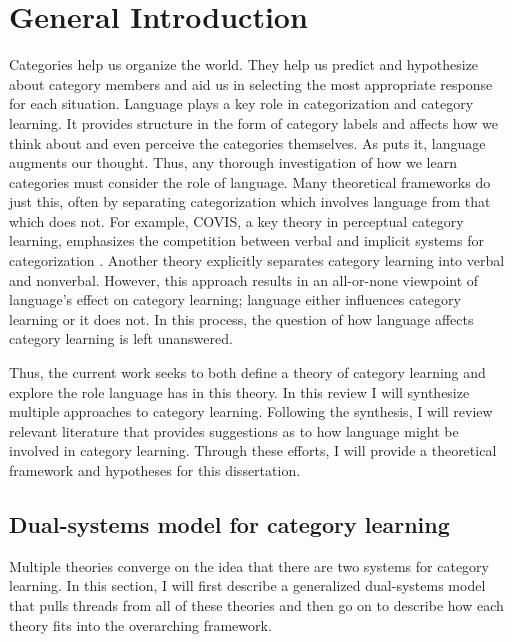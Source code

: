 \documentclass[../dissertation.tex]{subfiles}
\begin{document}
\section{General Introduction}\label{intro}

	Categories help us organize the world. They help us predict and hypothesize about category members and aid us in selecting the most appropriate response for each situation. Language plays a key role in categorization and category learning. It provides structure in the form of category labels and affects how we think about and even perceive the categories themselves. As \citet{Lupyan2012} puts it, language augments our thought. Thus, any thorough investigation of how we learn categories must consider the role of language. Many theoretical frameworks do just this, often by separating categorization which involves language from that which does not. For example, COVIS, a key theory in perceptual category learning, emphasizes the competition between verbal and implicit systems for categorization \citep{Ashby1998}. Another theory explicitly separates category learning into verbal and nonverbal\citep{Minda2010}. However, this approach results in an all-or-none viewpoint of language's effect on category learning; language either influences category learning or it does not. In this process, the question of how language affects category learning is left unanswered. \par
	Thus, the current work seeks to both define a theory of category learning and explore the role language has in this theory. In this review I will synthesize multiple approaches to category learning. Following the synthesis, I will review relevant literature that provides suggestions as to how language might be involved in category learning. Through these efforts, I will provide a theoretical framework and hypotheses for this dissertation.

\subsection{Dual-systems model for category learning}
	Multiple theories converge on the idea that there are two systems for category learning. In this section, I will first describe a generalized dual-systems model that pulls threads from all of these theories and then go on to describe how each theory fits into the overarching framework. 
	
\end{document}

